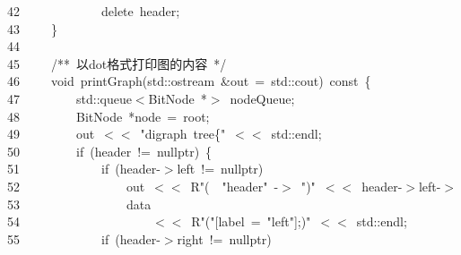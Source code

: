 \documentclass[11pt,a4paper]{ctexart}
\newcommand{\hlstd}[1]{\textcolor[rgb]{0.2,0.2,0.2}{#1}}
\newcommand{\hlstr}[1]{\textcolor[rgb]{0.06,0.58,0.63}{#1}}
\newcommand{\hlcom}[1]{\textcolor[rgb]{0.59,0.59,0.59}{#1}}
\newcommand{\hlopt}[1]{\textcolor[rgb]{0.2,0.2,0.2}{#1}}
\newcommand{\hllin}[1]{\textcolor[rgb]{0.59,0.59,0.59}{#1}}
\newcommand{\hlkwa}[1]{\textcolor[rgb]{0.23,0.42,0.78}{#1}}
\newcommand{\hlkwb}[1]{\textcolor[rgb]{0.63,0,0.31}{#1}}
\newcommand{\hlkwc}[1]{\textcolor[rgb]{0,0.63,0.31}{#1}}
\newcommand{\hlkwd}[1]{\textcolor[rgb]{0.78,0.23,0.41}{#1}}
\begin{document}
\hllin{42\ }\hlstd{}\hlstd{\ \ \ \ \ \ \ \ \ \ \ \ }\hlstd{}\hlkwa{delete\ }\hlstd{header}\hlopt{;}\\
\hllin{43\ }\hlstd{}\hlstd{\ \ \ \ }\hlstd{}\hlopt{\}}\\
\hllin{44\ }\hlstd{}\\
\hllin{45\ }\hlstd{}\hlstd{\ \ \ \ }\hlstd{}\hlcom{/{*}{*}\ 以dot格式打印图的内容\ {*}/}\hlstd{}\\
\hllin{46\ }\hlstd{}\hlstd{\ \ \ \ }\hlstd{}\hlkwb{void\ }\hlstd{}\hlkwd{printGraph}\hlstd{}\hlopt{(}\hlstd{}\hlkwc{std}\hlstd{}\hlopt{::}\hlstd{ostream\ }\hlopt{\&}\hlstd{out\ }\hlopt{=\ }\hlstd{}\hlkwc{std}\hlstd{}\hlopt{::}\hlstd{cout}\hlopt{)\ }\hlstd{}\hlkwb{const\ }\hlstd{}\hlopt{\{}\\
\hllin{47\ }\hlstd{}\hlstd{\ \ \ \ \ \ \ \ }\hlstd{}\hlkwc{std}\hlstd{}\hlopt{::}\hlstd{queue}\hlopt{$<$}\hlstd{BitNode\ }\hlopt{{*}$>$\ }\hlstd{nodeQueue}\hlopt{;}\\
\hllin{48\ }\hlstd{}\hlstd{\ \ \ \ \ \ \ \ }\hlstd{BitNode\ }\hlopt{{*}}\hlstd{node\ }\hlopt{=\ }\hlstd{root}\hlopt{;}\\
\hllin{49\ }\hlstd{}\hlstd{\ \ \ \ \ \ \ \ }\hlstd{out\ }\hlopt{$<$$<$\ }\hlstd{}\hlstr{"digraph\ tree\{"}\hlstd{\ }\hlopt{$<$$<$\ }\hlstd{}\hlkwc{std}\hlstd{}\hlopt{::}\hlstd{endl}\hlopt{;}\\
\hllin{50\ }\hlstd{}\hlstd{\ \ \ \ \ \ \ \ }\hlstd{}\hlkwa{if\ }\hlstd{}\hlopt{(}\hlstd{header\ }\hlopt{!=\ }\hlstd{}\hlkwc{nullptr}\hlstd{}\hlopt{)\ \{}\\
\hllin{51\ }\hlstd{}\hlstd{\ \ \ \ \ \ \ \ \ \ \ \ }\hlstd{}\hlkwa{if\ }\hlstd{}\hlopt{(}\hlstd{header}\hlopt{{-}$>$}\hlstd{left\ }\hlopt{!=\ }\hlstd{}\hlkwc{nullptr}\hlstd{}\hlopt{)}\\
\hllin{52\ }\hlstd{}\hlstd{\ \ \ \ \ \ \ \ \ \ \ \ \ \ \ \ }\hlstd{out\ }\hlopt{$<$$<$\ }\hlstd{R}\hlstr{"(}\hlstd{\ \ }\hlstr{"}\hlstd{header}\hlstr{"\ {-}$>$\ "}\hlstd{}\hlopt{)}\hlstd{}\hlstr{"\ $<$$<$\ header{-}$>$left{-}$>$}\Righttorque\\
\hllin{53\ }\hlstr{}\hlstd{\ \ \ \ \ \ \ \ \ \ \ \ \ \ \ \ }\hlstr{data}\\
\hllin{54\ }\hlstr{}\hlstd{\ \ \ \ \ \ \ \ \ \ \ \ \ \ \ \ \ \ \ \ }\hlstr{$<$$<$\ R"}\hlstd{}\hlopt{(}\hlstd{}\hlstr{"{[}label\ =\ "}\hlstd{left}\hlstr{"{]};)"}\hlstd{\ }\hlopt{$<$$<$\ }\hlstd{}\hlkwc{std}\hlstd{}\hlopt{::}\hlstd{endl}\hlopt{;}\\
\hllin{55\ }\hlstd{}\hlstd{\ \ \ \ \ \ \ \ \ \ \ \ }\hlstd{}\hlkwa{if\ }\hlstd{}\hlopt{(}\hlstd{header}\hlopt{{-}$>$}\hlstd{right\ }\hlopt{!=\ }\hlstd{}\hlkwc{nullptr}\hlstd{}\hlopt{)}\\
\end{document}
